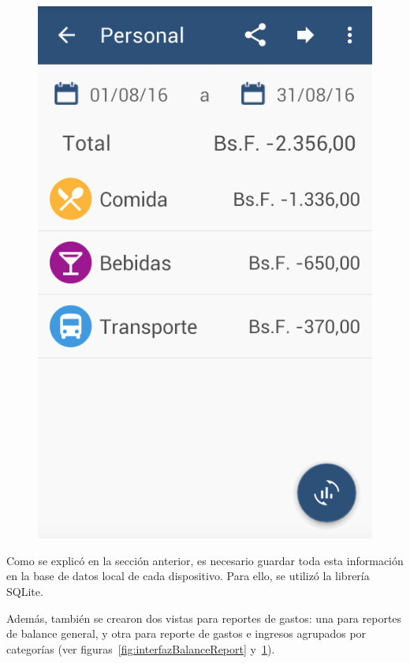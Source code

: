 \begin{figure}[ht]
\begin{minipage}{.5\textwidth}
  \includegraphics[scale=0.4,type=png,ext=.png,read=.png]{imagenes/categories_report}
  \captionsetup{justification=centering}
  \label{fig:interfazCategoriesReport}
\end{minipage}
\end{figure}

Como se explicó en la sección anterior, es necesario guardar toda esta información en la base de datos local de cada dispositivo. Para ello, se utilizó la librería SQLite.

Además, también se crearon dos vistas para reportes de gastos: una para reportes de balance general, y otra para reporte de gastos e ingresos agrupados por categorías (ver figuras~\ref{fig:interfazBalanceReport} y~\ref{fig:interfazCategoriesReport}).


